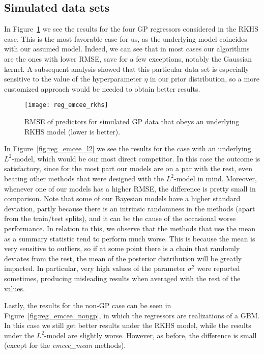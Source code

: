 \subsection*{Simulated data sets}

In Figure~\ref{fig:reg_emcee_rkhs} we see the results for the four GP regressors considered in the RKHS case. This is the most favorable case for us, as the underlying model coincides with our assumed model. Indeed, we can see that in most cases our algorithms are the ones with lower RMSE, save for a few exceptions, notably the Gaussian kernel. A subsequent analysis showed that this particular data set is especially sensitive to the value of the hyperparameter \(\eta\) in our prior distribution, so a more customized approach would be needed to obtain better results.

\vspace{.3em}

\begin{figure}[ht!]
  \centering
  \texttt{[image: reg\_emcee\_rkhs]}
  \caption{RMSE of predictors for simulated GP data that obeys an underlying RKHS model (lower is better).}\label{fig:reg_emcee_rkhs}
\end{figure}

In Figure~\ref{fig:reg_emcee_l2} we see the results for the case with an underlying \(L^2\)-model, which would be our most direct competitor. In this case the outcome is satisfactory, since for the most part our models are on a par with the rest, even beating other methods that were designed with the \(L^2\)-model in mind. Moreover, whenever one of our models has a higher RMSE, the difference is pretty small in comparison. Note that some of our Bayesian models have a higher standard deviation, partly because there is an intrinsic randomness in the methods (apart from the train/test splits), and it can be the cause of the occasional worse performance. In relation to this, we observe that the methods that use the mean as a summary statistic tend to perform much worse. This is because the mean is very sensitive to outliers, so if at some point there is a chain that randomly deviates from the rest, the mean of the posterior distribution will be greatly impacted. In particular, very high values of the parameter \(\sigma^2\) were reported sometimes, producing misleading results when averaged with the rest of the values.

\enlargethispage{1\baselineskip}

Lastly, the results for the non-GP case can be seen in Figure~\ref{fig:reg_emcee_nongp}, in which the regressors are realizations of a GBM. In this case we still get better results under the RKHS model, while the results under the \(L^2\)-model are slightly worse. However, as before, the difference is small (except for the \textit{emcee\_mean} methods).

